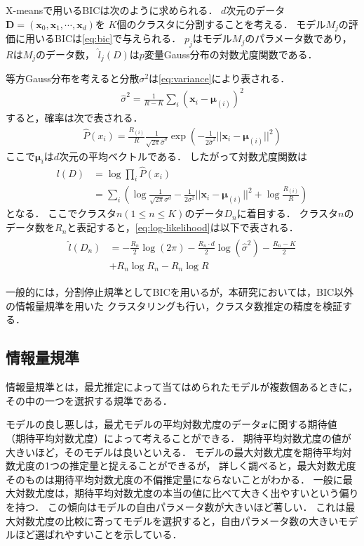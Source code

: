 X-meansで用いるBICは次のように求められる．
$d$次元のデータ${\bm D}=({\bm x_0}, {\bm x_1}, \cdots, {\bm x_d})$を
$K$個のクラスタに分割することを考える．
モデル$M_j$の評価に用いるBICは\eqref{eq:bic}で与えられる．
$p_j$はモデル$M_j$のパラメータ数であり，$R$は$M_j$のデータ数，
$\hat{l}_j(D)$は$p$変量Gauss分布の対数尤度関数である．

等方Gauss分布を考えると分散$\sigma^2$は\eqref{eq:variance}により表される．
\begin{align}
  \label{eq:variance}
  \hat{\sigma}^2 = \frac{1}{R-K}\sum_i\left({\bm x}_i-{\bm \mu}_{(i)}\right)^2
\end{align}
すると，確率は次で表される．
\begin{align}
  \label{eq:gaussian-distribution}
  \hat{P}(x_i) = \frac{R_{(i)}}{R}\frac{1}{\sqrt{2\pi}\hat{\sigma}^d}
    \exp\left(-\frac{1}{2\hat{\sigma}^2}||{\bm x}_i-{\bm \mu}_{(i)}||^2\right)
\end{align}
ここで${\bm \mu}_{i}$は$d$次元の平均ベクトルである．
したがって対数尤度関数は
\begin{align}
  \label{eq:log-likelihood}
  l(D) &= \log \prod_i \hat{P}(x_i) \\\nonumber
  &= \sum_i \left( \log\frac{1}{\sqrt{2\pi}\sigma^d}-\frac{1}{2\sigma^2}||{\bm x}_i-{\bm \mu}_{(i)}||^2 + \log\frac{R_{(i)}}{R} \right)
\end{align}
となる．
ここでクラスタ$n (1 \leq n \leq K)$のデータ$D_n$に着目する．
クラスタ$n$のデータ数を$R_n$と表記すると，\eqref{eq:log-likelihood}は以下で表される．
\begin{align}
  \begin{split}
    \hat{l}(D_n) &= -\frac{R_n}{2}\log(2\pi) - \frac{R_n \cdot d}{2}\log(\hat{\sigma}^2) -
    \frac{R_n - K}{2}\\ &
    + R_n\log R_n - R_n \log R
  \end{split}
\end{align}

一般的には，分割停止規準としてBICを用いるが，本研究においては，BIC以外の情報量規準を用いた
クラスタリングも行い，クラスタ数推定の精度を検証する．

\subsection{情報量規準}
情報量規準とは，最尤推定によって当てはめられたモデルが複数個あるときに，その中の一つを選択する規準である．

モデルの良し悪しは，最尤モデルの平均対数尤度のデータ$\boldsymbol{x}$に関する期待値
（期待平均対数尤度）によって考えることができる．
期待平均対数尤度の値が大きいほど，そのモデルは良いといえる．
モデルの最大対数尤度を期待平均対数尤度の1つの推定量と捉えることができるが，
詳しく調べると，最大対数尤度そのものは期待平均対数尤度の不偏推定量にならないことがわかる．
一般に最大対数尤度は，期待平均対数尤度の本当の値に比べて大きく出やすいという偏りを持つ．
この傾向はモデルの自由パラメータ数が大きいほど著しい．
これは最大対数尤度の比較に寄ってモデルを選択すると，自由パラメータ数の大きいモデルほど選ばれやすいことを示している．

